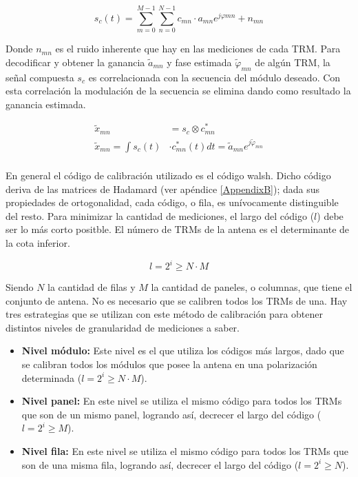 \begin{equation}
	s_c(t) = \sum_{m=0}^{M-1}\sum_{n=0}^{N-1}c_{mn}\cdot a_{mn}e^{j\varphi{mn}} + n_{mn}
\end{equation}

Donde $n_{mn}$ es el ruido inherente que hay en las mediciones de cada TRM. Para decodificar y obtener la ganancia 
$\tilde{a}_{mn}$ y fase estimada $\tilde\varphi_{mn}$ de algún TRM, la señal compuesta $s_c$ es correlacionada con 
la secuencia del módulo deseado. Con esta correlación la modulación de la secuencia se elimina dando como resultado
la ganancia estimada.

\begin{equation}
\begin{aligned}
	\tilde{x}_{mn} &= s_c \otimes c^*_{mn} \\
	\tilde{x}_{mn} = \int s_c(t) &\cdot c^*_{mn}(t) dt = \tilde{a}_{mn}e^{j\tilde{\varphi}_{mn}} \\
\end{aligned}
\label{eq:classic_correlation}
\end{equation}

En general el código de calibración utilizado es el código walsh. Dicho código deriva de las matrices de Hadamard (ver 
apéndice \ref{AppendixB}); dada sus propiedades de ortogonalidad, cada código, o fila, es unívocamente distinguible del 
resto. Para minimizar la cantidad de mediciones, el largo del código ($l$) debe ser lo más corto positble. El número de 
TRMs de la antena es el determinante de la cota inferior.

\begin{equation}
	l = 2^i \ge N \cdot M
\end{equation}

Siendo $N$ la cantidad de filas y $M$ la cantidad de paneles, o columnas, que tiene el conjunto de antena. No es necesario que 
se calibren todos los TRMs de una. Hay tres estrategias que se utilizan con este método de calibración para obtener 
distintos niveles de granularidad de mediciones a saber.

\begin{itemize}
	\item \textbf{Nivel módulo:} Este nivel es el que utiliza los códigos más largos, dado que se calibran todos los módulos que 
		posee la antena en una polarización determinada ($l = 2^i \ge N \cdot M$).
	\item \textbf{Nivel panel:} En este nivel se utiliza el mismo código para todos los TRMs que son de un mismo panel, 
		logrando así, decrecer el largo del código ($l = 2^i \ge M$).
	\item \textbf{Nivel fila:} En este nivel se utiliza el mismo código para todos los TRMs que son de una misma fila, 
		logrando así, decrecer el largo del código ($l = 2^i \ge N$).
\end{itemize}

